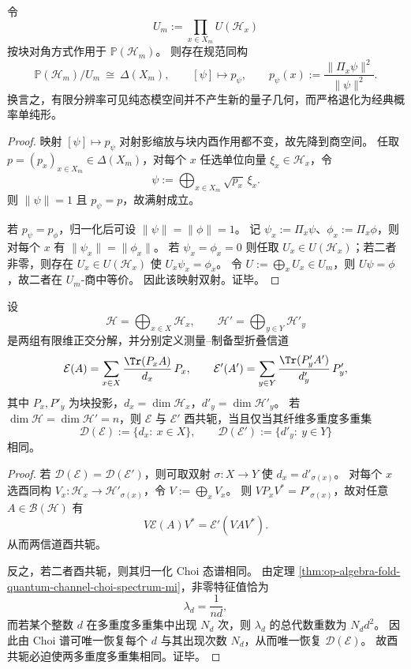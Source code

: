 \begin{proposition}[射影纯态的规范商恰为经典概率单纯形]\label{prop:conclusion-fold-quantum-projective-simplex-quotient}
令
\[
U_m:=\prod_{x\in X_m}U(\mathcal H_x)
\]
按块对角方式作用于 \(\mathbb P(\mathcal H_m)\)。
则存在规范同构
\[
\mathbb P(\mathcal H_m)/U_m\ \cong\ \Delta(X_m),
\qquad
[\psi]\longmapsto p_\psi,
\qquad
p_\psi(x):=\frac{\|\Pi_x\psi\|^2}{\|\psi\|^2}.
\]
换言之，有限分辨率可见纯态模空间并不产生新的量子几何，而严格退化为经典概率单纯形。
\end{proposition}
\begin{proof}
映射 \( [\psi]\mapsto p_\psi \) 对射影缩放与块内酉作用都不变，故先降到商空间。
任取 \(p=(p_x)_{x\in X_m}\in \Delta(X_m)\)，对每个 \(x\) 任选单位向量 \(\xi_x\in \mathcal H_x\)，令
\[
\psi:=\bigoplus_{x\in X_m}\sqrt{p_x}\,\xi_x.
\]
则 \(\|\psi\|=1\) 且 \(p_\psi=p\)，故满射成立。

若 \(p_\psi=p_\phi\)，归一化后可设 \(\|\psi\|=\|\phi\|=1\)。
记 \(\psi_x:=\Pi_x\psi\)、\(\phi_x:=\Pi_x\phi\)，则对每个 \(x\) 有 \(\|\psi_x\|=\|\phi_x\|\)。
若 \(\psi_x=\phi_x=0\) 则任取 \(U_x\in U(\mathcal H_x)\)；若二者非零，则存在 \(U_x\in U(\mathcal H_x)\) 使 \(U_x\psi_x=\phi_x\)。
令 \(U:=\bigoplus_x U_x\in U_m\)，则 \(U\psi=\phi\)，故二者在 \(U_m\)-商中等价。
因此该映射双射。证毕。
\end{proof}

\begin{theorem}[纤维多重度多重集给出折叠量子信道的有限分辨率完全分类]\label{thm:conclusion-fold-quantum-channel-multiplicity-classification}
设
\[
\mathcal H=\bigoplus_{x\in X}\mathcal H_x,
\qquad
\mathcal H'=\bigoplus_{y\in Y}\mathcal H'_y
\]
是两组有限维正交分解，并分别定义测量--制备型折叠信道
\[
\mathcal E(A)=\sum_{x\in X}\frac{\Tr(P_xA)}{d_x}\,P_x,
\qquad
\mathcal E'(A')=\sum_{y\in Y}\frac{\Tr(P'_yA')}{d'_y}\,P'_y,
\]
其中 \(P_x,P'_y\) 为块投影，\(d_x=\dim\mathcal H_x\)，\(d'_y=\dim\mathcal H'_y\)。
若 \(\dim\mathcal H=\dim\mathcal H'=n\)，则 \(\mathcal E\) 与 \(\mathcal E'\) 酉共轭，当且仅当其纤维多重度多重集
\[
\mathcal D(\mathcal E):=\{d_x:\ x\in X\},
\qquad
\mathcal D(\mathcal E'):=\{d'_y:\ y\in Y\}
\]
相同。
\end{theorem}
\begin{proof}
若 \(\mathcal D(\mathcal E)=\mathcal D(\mathcal E')\)，则可取双射 \(\sigma:X\to Y\) 使 \(d_x=d'_{\sigma(x)}\)。
对每个 \(x\) 选酉同构 \(V_x:\mathcal H_x\to \mathcal H'_{\sigma(x)}\)，令 \(V:=\bigoplus_x V_x\)。
则 \(VP_xV^\ast=P'_{\sigma(x)}\)，故对任意 \(A\in\mathcal B(\mathcal H)\) 有
\[
V\mathcal E(A)V^\ast=\mathcal E'(VAV^\ast).
\]
从而两信道酉共轭。

反之，若二者酉共轭，则其归一化 Choi 态谱相同。
由定理 \ref{thm:op-algebra-fold-quantum-channel-choi-spectrum-mi}，非零特征值恰为
\[
\lambda_d=\frac{1}{nd},
\]
而若某个整数 \(d\) 在多重度多重集中出现 \(N_d\) 次，则 \(\lambda_d\) 的总代数重数为 \(N_d d^2\)。
因此由 Choi 谱可唯一恢复每个 \(d\) 与其出现次数 \(N_d\)，从而唯一恢复 \(\mathcal D(\mathcal E)\)。
故酉共轭必迫使两多重度多重集相同。证毕。
\end{proof}


